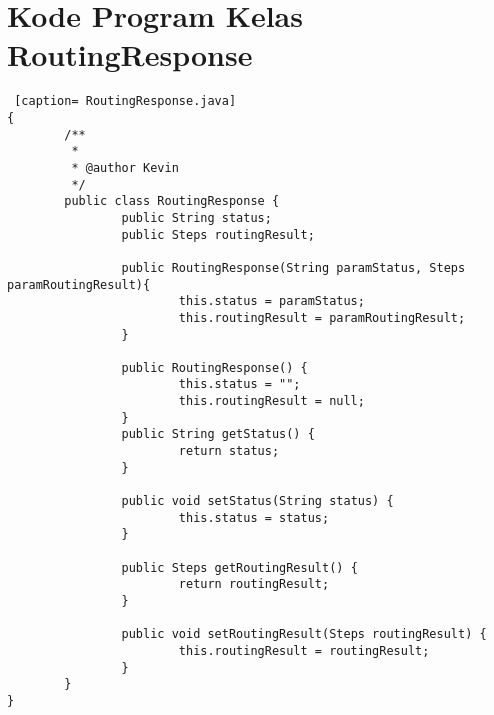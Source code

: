 \chapter{Kode Program Kelas RoutingResponse}
\label{Kode Program Kelas RoutingResponse}

\begin{lstlisting} [caption= RoutingResponse.java]
{ 
		/**
		 *
		 * @author Kevin
		 */
		public class RoutingResponse {
				public String status;
				public Steps routingResult;

				public RoutingResponse(String paramStatus, Steps paramRoutingResult){
						this.status = paramStatus;
						this.routingResult = paramRoutingResult;
				}

				public RoutingResponse() {
						this.status = "";
						this.routingResult = null;
				}
				public String getStatus() {
						return status;
				}

				public void setStatus(String status) {
						this.status = status;
				}

				public Steps getRoutingResult() {
						return routingResult;
				}

				public void setRoutingResult(Steps routingResult) {
						this.routingResult = routingResult;
				}
		}
}
\end{lstlisting}